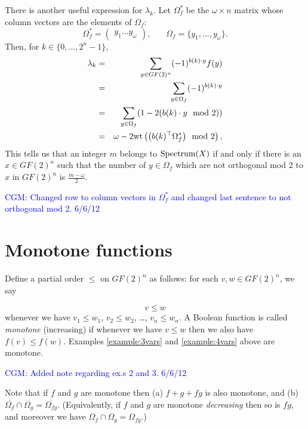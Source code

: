 \documentclass[12pt]{article}
\def\blue#1{\textcolor{blue}{#1}}
\newcommand{\cgm}[1]{\blue{CGM: #1}}
\newtheorem{remark}{Remark}
\begin{document}
There is another useful expression for $\lambda_k$.
Let $\Omega_f^*$ be the $\omega\times n$ matrix whose column vectors
are the elements of $\Omega_f$:
\[
\Omega_f^* =
\left(
\begin{array}{c}
y_1
\hdots 
y_\omega
\end{array}
\right),
\ \ \ \ \ \ \ \
\Omega_f = \{y_1,\dots, y_\omega\}.
\]
Then, for ${k \in \{0,\ldots,2^n-1\}}$,
\begin{eqnarray*}
\lambda_k & =& \sum_{y\in GF(2)^n}  (-1)^{b(k)\cdot y}f(y)\\
 & =&  \sum_{y\in \Omega_f}  (-1)^{b(k)\cdot y}\\
 & =&  \sum_{y\in \Omega_f}  (1 - 2 (b(k)\cdot y\mod 2))\\
 & = & \omega - 2 {\rm wt}\left( \big(b(k)^\top \Omega_f^*\big) \mod 2\right),\\
\end{eqnarray*}
This tells us that an integer $m$ belongs to
$ {\rm Spectrum}(X)$ if and only if there is
an $x\in GF(2)^n$ such that
the number of $y\in \Omega_f$ which are not orthogonal mod 2 to $x$ in $GF(2)^n$ is
$\frac{m-\omega}{2}$.

\cgm{Changed row to column vectors in $\Omega_f^*$ and changed last sentence to not orthogonal mod 2. 6/6/12}



\section{Monotone functions}

Define a partial order $\leq $ on $GF(2)^n$ as follows:
for each $v,w\in GF(2)^n$, we say

\[
v\leq w
\]
whenever we have
$v_1 \leq w_1$, $v_2 \leq w_2$, \dots, $v_n \leq w_n$.
A Boolean function is called {\it monotone} (increasing) if whenever
we have $v\leq w$ then we also have $f(v) \leq f(w)$.  
Examples \ref{example:3vars} and 
\ref{example:4vars} above are monotone.

\cgm{Added note regarding ex.s 2 and 3. 6/6/12}

Note that if $f$ and $g$ are monotone then (a) $f+g+fg$ is also
monotone, and (b) $\overline{\Omega_f}\cap  \overline{\Omega_g}
=\overline{\Omega_{fg}}$.
(Equivalently, if $f$ and $g$ are monotone {\it decreasing} then
so is $fg$, and moreover we have $\Omega_f\cap \Omega_g
=\Omega_{fg}$.)
\end{document}
